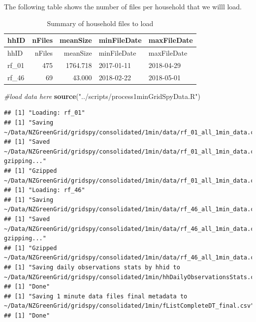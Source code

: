 \documentclass[]{article}
\newenvironment{Shaded}{\begin{snugshade}}{\end{snugshade}}
\newcommand{\KeywordTok}[1]{\textcolor[rgb]{0.13,0.29,0.53}{\textbf{#1}}}
\newcommand{\DataTypeTok}[1]{\textcolor[rgb]{0.13,0.29,0.53}{#1}}
\newcommand{\StringTok}[1]{\textcolor[rgb]{0.31,0.60,0.02}{#1}}
\newcommand{\CommentTok}[1]{\textcolor[rgb]{0.56,0.35,0.01}{\textit{#1}}}
\newcommand{\OperatorTok}[1]{\textcolor[rgb]{0.81,0.36,0.00}{\textbf{#1}}}
\newcommand{\NormalTok}[1]{#1}
\begin{document}
The following table shows the number of files per household that we
willl load.

\begin{Shaded}
\end{Shaded}

\begin{longtable}[]{@{}lrrll@{}}
\caption{Summary of household files to load}\tabularnewline
\toprule
hhID & nFiles & meanSize & minFileDate & maxFileDate\tabularnewline
\midrule
\endfirsthead
\toprule
hhID & nFiles & meanSize & minFileDate & maxFileDate\tabularnewline
\midrule
\endhead
rf\_01 & 475 & 1764.718 & 2017-01-11 & 2018-04-29\tabularnewline
rf\_46 & 69 & 43.000 & 2018-02-22 & 2018-05-01\tabularnewline
\bottomrule
\end{longtable}

\begin{Shaded}
\begin{Highlighting}[]
\CommentTok{#load data here}
\KeywordTok{source}\NormalTok{(}\StringTok{"../scripts/process1minGridSpyData.R"}\NormalTok{)}
\end{Highlighting}
\end{Shaded}

\begin{verbatim}
## [1] "Loading: rf_01"
## [1] "Saving ~/Data/NZGreenGrid/gridspy/consolidated/1min/data/rf_01_all_1min_data.csv..."
## [1] "Saved ~/Data/NZGreenGrid/gridspy/consolidated/1min/data/rf_01_all_1min_data.csv, gzipping..."
## [1] "Gzipped ~/Data/NZGreenGrid/gridspy/consolidated/1min/data/rf_01_all_1min_data.csv"
## [1] "Loading: rf_46"
## [1] "Saving ~/Data/NZGreenGrid/gridspy/consolidated/1min/data/rf_46_all_1min_data.csv..."
## [1] "Saved ~/Data/NZGreenGrid/gridspy/consolidated/1min/data/rf_46_all_1min_data.csv, gzipping..."
## [1] "Gzipped ~/Data/NZGreenGrid/gridspy/consolidated/1min/data/rf_46_all_1min_data.csv"
## [1] "Saving daily observations stats by hhid to ~/Data/NZGreenGrid/gridspy/consolidated/1min/hhDailyObservationsStats.csv"
## [1] "Done"
## [1] "Saving 1 minute data files final metadata to ~/Data/NZGreenGrid/gridspy/consolidated/1min/fListCompleteDT_final.csv"
## [1] "Done"
\end{verbatim}
\end{document}
